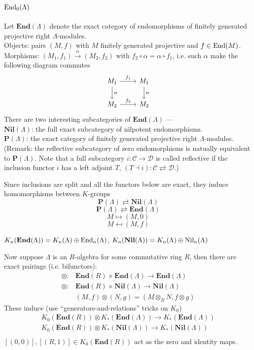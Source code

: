 \subsection{$\mathrm{End}_0(\Lambda)$}
Let $\mathbf{End}(\Lambda)$ denote the exact category of endomorphisms of finitely generated projective right $\Lambda$-modules.\\
Objects: pairs $(M,f)$ with $M$ finitely generated projective and $f\in \mathrm{End}(M)$.\\
Morphisms: $(M_1,f_1) \overset{\alpha}\longrightarrow (M_2,f_2)$ with $f
_2\circ \alpha =\alpha \circ f_1$, i.e. such $\alpha$ make the following diagram commutes
\[
\begin{tikzcd}
	M_1 \arrow[r,"f_1"] \arrow[d,"\alpha"] & M_1 \arrow[d,"\alpha"]\\
	M_2 \arrow[r,"f_2"]  & M_2
\end{tikzcd}
\]
There are two interesting subcategories of $\mathbf{End}(\Lambda)$ --- \\
$\mathbf{Nil}(\Lambda)$: the full exact subcategory of nilpotent endomorphisms.\\
$\mathbf{P}(\Lambda)$: the exact category of finitely generated projective right $\Lambda$-modules. (Remark: the reflective subcategory of zero endomorphisms is natually equivalent to $\mathbf{P}(\Lambda)$. Note that a full subcategory $i\colon \mathcal{C} \longrightarrow \mathcal{D}$ is called reflective if the inclusion functor $i$ has a left adjoint $T$, $(T \dashv i) \colon \mathcal{C}  \rightleftarrows \mathcal{D}$.)

Since inclusions are split and all the functors below are exact, they induce homomorphisms between $K$-groups
\[\mathbf{P}(\Lambda)  \rightleftarrows \mathbf{Nil}(\Lambda)\]
\[\mathbf{P}(\Lambda)  \rightleftarrows \mathbf{End}(\Lambda)\]
\[M \mapsto (M,0)\]
\[M \mapsfrom (M,f)\]
\begin{definition}
	$K_n(\mathbf{End}(\Lambda))=K_n(\Lambda) \oplus \mathrm{End}_n(\Lambda)$, $K_n(\mathbf{Nil}(\Lambda))=K_n(\Lambda) \oplus \mathrm{Nil}_n(\Lambda)$
\end{definition}
Now suppose $\Lambda$ is an $R$-algebra for some commutative ring $R$, then there are exact pairings (i.e. bifunctors):
\begin{align*}
	\otimes\colon &\mathbf{End}(R) \times \mathbf{End}(\Lambda) \longrightarrow \mathbf{End}(\Lambda) \\
	\otimes\colon &\mathbf{End}(R) \times \mathbf{Nil}(\Lambda) \longrightarrow \mathbf{Nil}(\Lambda) \\
 				  & (M,f) \otimes (N,g)=(M\otimes_R N, f\otimes g)
\end{align*}
These induce (use ``generators-and-relations'' tricks on $K_0$)
\begin{align*}
	K_0(\mathbf{End}(R)) \otimes K_*(\mathbf{End}(\Lambda)) \longrightarrow K_*(\mathbf{End}(\Lambda)) \\
	K_0(\mathbf{End}(R)) \otimes K_*(\mathbf{Nil}(\Lambda)) \longrightarrow K_*(\mathbf{Nil}(\Lambda)) \\
\end{align*}
$[(0,0)], [(R,1)]\in K_0(\mathbf{End}(R))$ act as the zero and identity maps.

